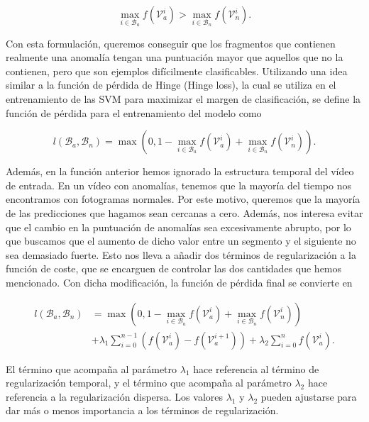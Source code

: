 \documentclass[../main.tex]{memoir}
\begin{document}
\[ \max_{i \in \mathcal{B}_a}{f(\mathcal{V}^i_a)} > \max_{i \in
    \mathcal{B}_n}{f(\mathcal{V}^i_n)}. \]

Con esta formulación, queremos conseguir que los fragmentos que
contienen realmente una anomalía tengan una puntuación mayor que
aquellos que no la contienen, pero que son ejemplos difícilmente
clasificables. Utilizando una idea similar a la función de pérdida de
Hinge (Hinge loss), la cual se utiliza en el entrenamiento de las SVM
para maximizar el margen de clasificación, se define la función de
pérdida para el entrenamiento del modelo como

\[ l(\mathcal{B}_a, \mathcal{B}_n) = \max{(0, 1 - \max_{i \in
      \mathcal{B}_a}{f(\mathcal{V}^i_a)} + \max_{i \in
      \mathcal{B}_n}{f(\mathcal{V}^i_n)})}. \]

Además, en la función anterior hemos ignorado la estructura temporal
del vídeo de entrada. En un vídeo con anomalías, tenemos que la
mayoría del tiempo nos encontramos con fotogramas normales. Por este
motivo, queremos que la mayoría de las predicciones que hagamos sean
cercanas a cero. Además, nos interesa evitar que el cambio en la
puntuación de anomalías sea excesivamente abrupto, por lo que buscamos
que el aumento de dicho valor entre un segmento y el siguiente no sea
demasiado fuerte. Esto nos lleva a añadir dos términos de
regularización a la función de coste, que se encarguen de controlar
las dos cantidades que hemos mencionado. Con dicha modificación, la
función de pérdida final se convierte en

\begin{align*}
  l(\mathcal{B}_a, \mathcal{B}_n) &= \max{(0, 1 - \max_{i \in
                                    \mathcal{B}_a}{f(\mathcal{V}^i_a)} + \max_{i \in
                                    \mathcal{B}_n}{f(\mathcal{V}^i_n)})}\\
                                  & + \lambda_1
                                    \sum_{i=0}^{n-1} (f(\mathcal{V}_a^i) - f(\mathcal{V}_a^{i+1})) +
                                    \lambda_2 \sum_{i=0}^{n} f(\mathcal{V}_a^i).
\end{align*}

El término que acompaña al parámetro $\lambda_1$ hace referencia al
término de regularización temporal, y el término que acompaña al
parámetro $\lambda_2$ hace referencia a la regularización dispersa.
Los valores $\lambda_1$ y $\lambda_2$ pueden ajustarse para dar más
o menos importancia a los términos de regularización.\\
\end{document}
